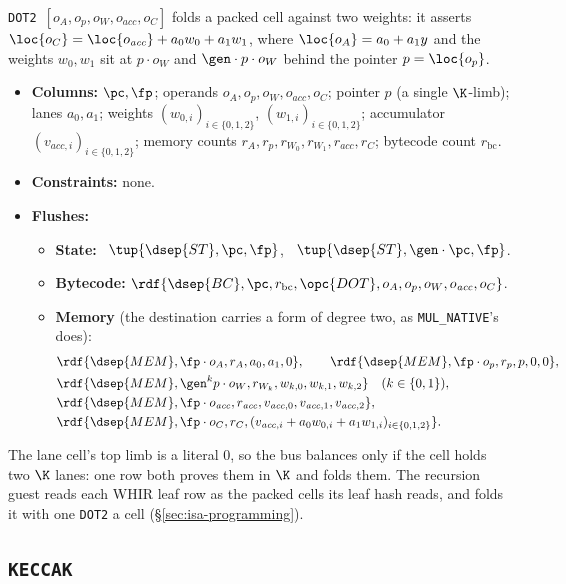 \texttt{DOT2}\ $[o_A,o_p,o_W,o_{\mathit{acc}},o_C]$ folds a packed cell against two weights: it asserts $\loc{o_C}=\loc{o_{\mathit{acc}}}+a_0w_0+a_1w_1$, where $\loc{o_A}=a_0+a_1y$ and the weights $w_0,w_1$ sit at $p\cdot o_W$ and $\gen\cdot p\cdot o_W$ behind the pointer $p=\loc{o_p}$.
\begin{itemize}
\item \textbf{Columns:} $\pc,\fp$; operands $o_A,o_p,o_W,o_{\mathit{acc}},o_C$; pointer $p$ (a single $\K$-limb); lanes $a_0,a_1$; weights $(w_{0,i})_{i\in\{0,1,2\}}$, $(w_{1,i})_{i\in\{0,1,2\}}$; accumulator $(v_{\mathit{acc},i})_{i\in\{0,1,2\}}$; memory counts $r_A,r_p,r_{W_0},r_{W_1},r_{\mathit{acc}},r_C$; bytecode count $r_{\mathrm{bc}}$.
\item \textbf{Constraints:} none.
\item \textbf{Flushes:}
  \begin{itemize}
  \item \textbf{State:} \pull\ $\tup{\dsep{ST},\pc,\fp}$, \push\ $\tup{\dsep{ST},\gen\cdot\pc,\fp}$.
  \item \textbf{Bytecode:} $\rdf{\dsep{BC},\pc,r_{\mathrm{bc}},\opc{DOT},o_A,o_p,o_W,o_{\mathit{acc}},o_C}$.
  \item \textbf{Memory} (the destination carries a form of degree two, as \texttt{MUL\_NATIVE}'s does):
    \begin{align*}
      &\rdf{\dsep{MEM},\fp\cdot o_A,r_A,a_0,a_1,0},\qquad \rdf{\dsep{MEM},\fp\cdot o_p,r_p,p,0,0},\\
      &\rdf{\dsep{MEM},\gen^{k}p\cdot o_W,r_{W_k},w_{k,0},w_{k,1},w_{k,2}}\quad(k\in\{0,1\}),\\
      &\rdf{\dsep{MEM},\fp\cdot o_{\mathit{acc}},r_{\mathit{acc}},v_{\mathit{acc},0},v_{\mathit{acc},1},v_{\mathit{acc},2}},\\
      &\rdf{\dsep{MEM},\fp\cdot o_C,r_C,(v_{\mathit{acc},i}+a_0w_{0,i}+a_1w_{1,i})_{i\in\{0,1,2\}}}.
    \end{align*}
  \end{itemize}
\end{itemize}
The lane cell's top limb is a literal $0$, so the bus balances only if the cell holds two $\K$ lanes: one row both proves them in $\K$ and folds them. The recursion guest reads each WHIR leaf row as the packed cells its leaf hash reads, and folds it with one \texttt{DOT2} a cell (\S\ref{sec:isa-programming}).

\subsection{\texttt{KECCAK}}\label{sec:tab-keccak}

